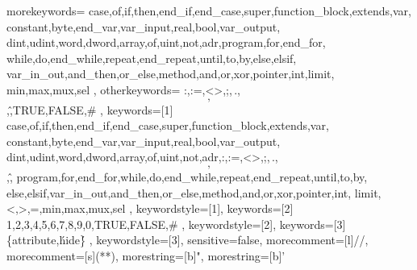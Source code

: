 
{
    morekeywords={
        case,of,if,then,end_if,end_case,super,function_block,extends,var,
        constant,byte,end_var,var_input,real,bool,var_output,
        dint,udint,word,dword,array,of,uint,not,adr,program,for,end_for,
        while,do,end_while,repeat,end_repeat,until,to,by,else,elsif,
        var_in_out,and_then,or_else,method,and,or,xor,pointer,int,limit,
        min,max,mux,sel
    },
    otherkeywords={
        :,:=,<>,;,\,.,\[,\],\^,TRUE,FALSE,\#
    },
    keywords=[1]{
        case,of,if,then,end_if,end_case,super,function_block,extends,var,
        constant,byte,end_var,var_input,real,bool,var_output,
        dint,udint,word,dword,array,of,uint,not,adr,:,:=,<>,;,\,.,\[,\],\^,
        program,for,end_for,while,do,end_while,repeat,end_repeat,until,to,by,
        else,elsif,var_in_out,and_then,or_else,method,and,or,xor,pointer,int,
        limit,<,>,=,min,max,mux,sel
    },
    keywordstyle=[1]\color{blue},
    keywords=[2]{
        1,2,3,4,5,6,7,8,9,0,TRUE,FALSE,\#
    },
    keywordstyle=[2]\color{codepurple},
    keywords=[3]{
        \{attribute,\'hide\'\}
    },
    keywordstyle=[3]\color{codegray},
    sensitive=false,
    morecomment=[l]{//}, 
    morecomment=[s]{(*}{*)},
    morestring=[b]{"},
    morestring=[b]{'}
}

